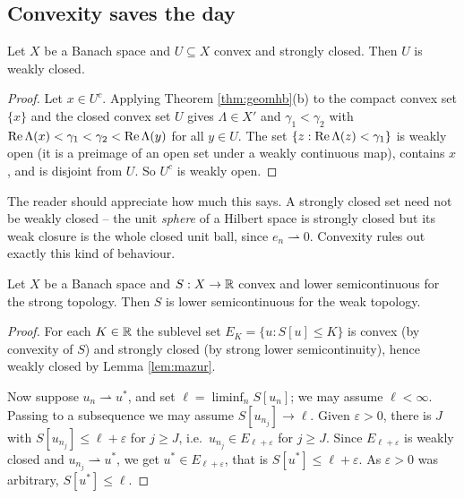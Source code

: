 \documentclass[a4paper]{scrartcl}
\newcommand{\weakto}{\rightharpoonup}
\begin{document}
\subsection{Convexity saves the day}

\begin{lemma}[Mazur]\label{lem:mazur}
	Let $X$ be a Banach space and $U \subseteq X$ convex and strongly closed. Then $U$ is weakly closed.
\end{lemma}

\begin{proof}
	Let $x \in U^c$. Applying Theorem \ref{thm:geomhb}(b) to the compact convex set $\{x\}$ and the closed convex set $U$ gives $\Lambda \in X'$ and $\gamma_1 < \gamma_2$ with $\operatorname{Re}\Lambda(x) < \gamma_1 < \gamma_2 < \operatorname{Re} \Lambda(y)$ for all $y \in U$. The set $\{z : \operatorname{Re} \Lambda(z) < \gamma_1\}$ is weakly open (it is a preimage of an open set under a weakly continuous map), contains $x$, and is disjoint from $U$. So $U^c$ is weakly open.
\end{proof}

The reader should appreciate how much this says. A strongly closed set need not be weakly closed -- the unit \emph{sphere} of a Hilbert space is strongly closed but its weak closure is the whole closed unit ball, since $e_n \weakto 0$. Convexity rules out exactly this kind of behaviour.

\begin{theorem}\label{thm:convexweaklsc}
	Let $X$ be a Banach space and $S : X \to \mathbb{R}$ convex and lower semicontinuous for the strong topology. Then $S$ is lower semicontinuous for the weak topology.
\end{theorem}

\begin{proof}
	For each $K \in \mathbb{R}$ the sublevel set $E_K = \{u : S[u]\le K\}$ is convex (by convexity of $S$) and strongly closed (by strong lower semicontinuity), hence weakly closed by Lemma \ref{lem:mazur}.

	Now suppose $u_n \weakto u^*$, and set $\ell = \liminf_n S[u_n]$; we may assume $\ell < \infty$. Passing to a subsequence we may assume $S[u_{n_j}]\to \ell$. Given $\varepsilon > 0$, there is $J$ with $S[u_{n_j}]\le \ell + \varepsilon$ for $j \ge J$, i.e.\ $u_{n_j}\in E_{\ell + \varepsilon}$ for $j \ge J$. Since $E_{\ell+\varepsilon}$ is weakly closed and $u_{n_j}\weakto u^*$, we get $u^* \in E_{\ell+\varepsilon}$, that is $S[u^*]\le\ell+\varepsilon$. As $\varepsilon > 0$ was arbitrary, $S[u^*]\le\ell$.
\end{proof}
\end{document}

